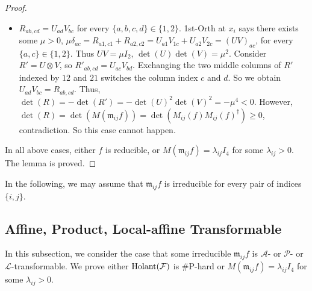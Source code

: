 \begin{proof}
\begin{itemize}
        \item $R_{ab,cd}=U_{ad}V_{bc}$ for every $\{a,b,c,d\}\in\{1,2\}.$
        {\sc 1st-Orth} at $x_i$ says there exists some $\mu>0$, \(\mu\delta_{ac}=R_{a1,c1}+R_{a2,c2}=U_{a1}V_{1c}+U_{a2}V_{2c}=(UV)_{ac}\), for every $\{a,c\}\in\{1,2\}.$
        Thus $UV=\mu I_2,\,\det(U)\det(V)=\mu^2.$
        Consider $R'=U\otimes V$, so $R'_{ab,cd}=U_{ac}V_{bd}.$
        Exchanging the two middle columns of $R'$ indexed by $12$ and $21$ switches the column index $c$ and $d$.
        So we obtain $U_{ad}V_{bc}=R_{ab,cd}.$
        Thus, $\det(R)=-\det(R')=-\det(U)^2\det(V)^2=-\mu^4<0.$
        However, $\det(R)=\det(M(\mathfrak{m}_{ij}f))=\det(M_{ij}(f)M_{ij}(f)^\dagger)\ge0$, contradiction.
        So this case cannot happen.
    \end{itemize}
    In all above cases, either $f$ is reducible, or $M(\mathfrak{m}_{ij}f)=\lambda_{ij}I_4$ for some $\lambda_{ij}>0.$
    The lemma is proved.
\end{proof}

In the following, we may assume that $\mathfrak{m}_{ij}f$ is irreducible for every pair of indices $\{i,j\}$.

\subsection{Affine, Product, Local-affine Transformable}

In this subsection, we consider the case that some irreducible $\mathfrak{m}_{ij}f$ is $\mathscr{A}$- or $\mathscr{P}$- or $\mathscr{L}$-transformable.
We prove either $\operatorname{Holant}(\mathcal{F})$ is \#P-hard or $M(\mathfrak{m}_{ij}f)=\lambda_{ij}I_4$ for some $\lambda_{ij}>0.$

